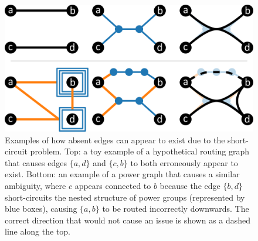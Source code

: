 \begin{figure}
  \centering
  \includegraphics[width=.8\linewidth]{power/shortcircuit.pdf}
  \caption[Examples of the short-circuit problem]{Examples of how absent edges can appear to exist due to the short-circuit problem.
  Top: a toy example of a hypothetical routing graph that causes edges $\{a,d\}$ and $\{c,b\}$ to both erroneously appear to exist.
  Bottom: an example of a power graph that causes a similar ambiguity, where $c$ appears connected to $b$ because the edge $\{b,d\}$ short-circuits the nested structure of power groups (represented by blue boxes), causing $\{a,b\}$ to be routed incorrectly downwards.
  The correct direction that would not cause an issue is shown as a dashed line along the top.
  }
  \label{fig:overlap}
\end{figure}

